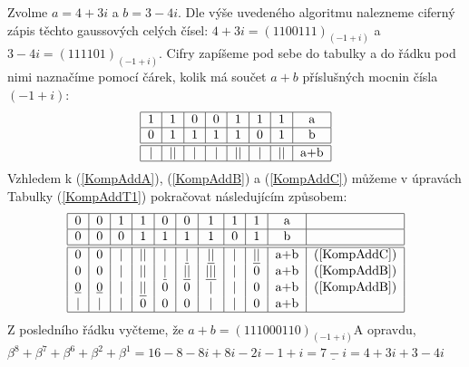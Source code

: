 \documentclass[czech,bachelor,dept470,male]{diploma}
\begin{document}
\begin{example}
	\item Zvolme $a = 4+3i$ a $b = 3-4i$. Dle výše uvedeného algoritmu nalezneme ciferný zápis těchto gaussových celých čísel: $4+3i = (1100111)_{(-1+i)}$ a $3-4i = (111101)_{(-1+i)}$. Cifry zapíšeme pod sebe do tabulky a do řádku pod nimi naznačíme pomocí čárek, kolik má součet $a+b$ příslušných mocnin čísla $(-1+i)$:
	\begin{equation}\label{KompAddT1}
		\begin{tabular}{|c|c|c|c|c|c|c|c|}
			\hline
			1 & 1  & 0 & 0 & 1  & 1 & 1  & a   \\ \hline
			0 & 1  & 1 & 1 & 1  & 0 & 1  & b   \\ \hline \hline
			| & || & | & | & || & | & || & a+b \\
			\hline
		\end{tabular}
	\end{equation}
	Vzhledem k (\ref{KompAddA}), (\ref{KompAddB}) a (\ref{KompAddC}) můžeme v úpravách Tabulky (\ref{KompAddT1}) pokračovat následujícím způsobem:
	\begin{equation}\label{KompAddT2}
		\begin{tabular}{|c|c|c|c|c|c|c|c|c|c|c|}
			\hline
			0             & 0             & 1 & 1              & 0             & 0              & 1               & 1 & 1              & a   &                  \\ \hline
			0             & 0             & 0 & 1              & 1             & 1              & 1               & 0 & 1              & b   &                  \\ \hline \hline
			0             & 0             & | & ||             & |             & \underline{|}  & \underline{||}  & | & \underline{||} & a+b & (\ref{KompAddC}) \\
			0             & 0             & | & ||             & \underline{|} & \underline{||} & \underline{|||} & | & 0              & a+b & (\ref{KompAddB}) \\
			\underline{0} & \underline{0} & | & \underline{||} & 0             & 0              & |               & | & 0              & a+b & (\ref{KompAddB}) \\
			|             & |             & | & 0              & 0             & 0              & |               & | & 0              & a+b &                  \\
			\hline
		\end{tabular}
	\end{equation}
	Z posledního řádku vyčteme, že $a + b = (111000110)_{(-1+i)}$\newline A opravdu, $\beta^8+\beta^7+\beta^6+\beta^2+\beta^1=16-8-8i+8i-2i-1+i=\underline{7-i}=4+3i+3-4i$
\end{example}
\newpage
\end{document}
